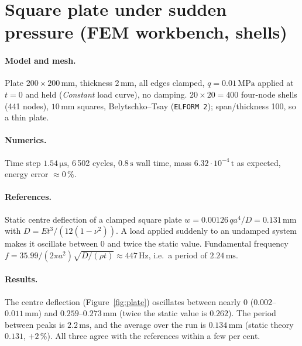 \documentclass[11pt,a4paper]{article}
\newcommand{\unit}[1]{\,\mathrm{#1}}
\begin{document}
\section{Square plate under sudden pressure (FEM workbench, shells)}

\paragraph{Model and mesh.} Plate $200\times200\unit{mm}$, thickness $2\unit{mm}$, all edges
clamped, $q=0.01\unit{MPa}$ applied at $t=0$ and held (\emph{Constant} load curve), no damping.
$20\times20=400$ four-node shells (441 nodes), $10\unit{mm}$ squares, Belytschko--Tsay
(\texttt{ELFORM~2}); span/thickness 100, so a thin plate.

\paragraph{Numerics.} Time step $1.54\unit{\mu s}$, 6\,502 cycles, $0.8\unit{s}$ wall time,
mass $6.32\cdot10^{-4}\unit{t}$ as expected, energy error $\approx0\,\%$.

\paragraph{References.} Static centre deflection of a clamped square plate
$w=0.00126\,q a^4/D=0.131\unit{mm}$ with $D=Et^3/(12(1-\nu^2))$. A load applied suddenly to an
undamped system makes it oscillate between 0 and twice the static value. Fundamental frequency
$f=35.99/(2\pi a^2)\sqrt{D/(\rho t)}\approx447\unit{Hz}$, i.e.\ a period of $2.24\unit{ms}$.

\paragraph{Results.} The centre deflection (Figure~\ref{fig:plate}) oscillates between nearly 0
($0.002$--$0.011\unit{mm}$) and $0.259$--$0.273\unit{mm}$ (twice the static value is $0.262$). The
period between peaks is $2.2\unit{ms}$, and the average over the run is $0.134\unit{mm}$ (static
theory $0.131$, $+2\,\%$). All three agree with the references within a few per cent.
\end{document}

